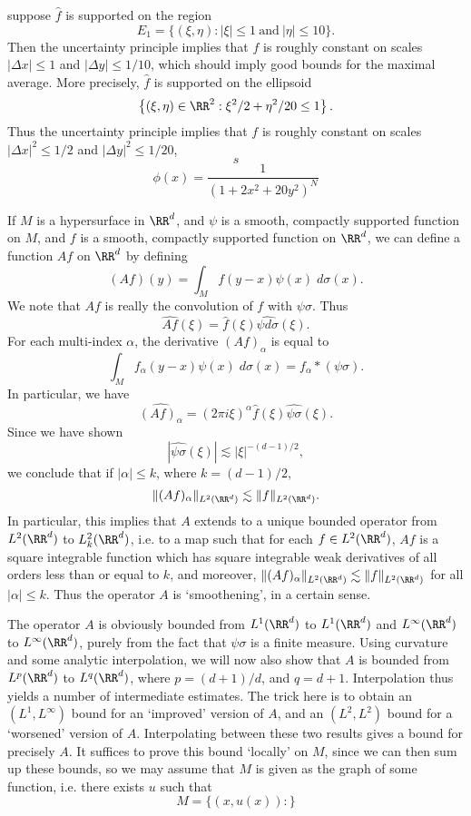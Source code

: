 suppose $\widehat{f}$ is supported on the region
%
\[ E_1 = \{ (\xi,\eta) : |\xi| \leq 1\ \text{and}\ |\eta| \leq 10 \}. \]
%
Then the uncertainty principle implies that $f$ is roughly constant on scales $|\Delta x| \leq 1$ and $|\Delta y| \leq 1/10$, which should imply good bounds for the maximal average. More precisely, $\widehat{f}$ is supported on the ellipsoid
%
\[ \left\{ (\xi,\eta) \in \RR^2 : \xi^2/2 + \eta^2/20 \leq 1 \right\}. \]
%
Thus the uncertainty principle implies that $f$ is roughly constant on scales $|\Delta x|^2 \leq 1/2$ and $|\Delta y|^2 \leq 1/20$,
%
\[ s \]
%
\[ \phi(x) = \frac{1}{( 1 + 2 x^2 + 20 y^2 )^N} \] 


\begin{example}
  If $M$ is a hypersurface in $\RR^d$, and $\psi$ is a smooth, compactly supported function on $M$, and $f$ is a smooth, compactly supported function on $\RR^d$, we can define a function $Af$ on $\RR^d$ by defining
  \[ (Af)(y) = \int_M f(y - x) \psi(x)\; d\sigma(x). \]
  We note that $Af$ is really the convolution of $f$ with $\psi \sigma$. Thus
  \[ \widehat{Af}(\xi) = \widehat{f}(\xi) \widehat{\psi d\sigma}(\xi). \]
  For each multi-index $\alpha$, the derivative $(Af)_\alpha$ is equal to
  \[ \int_M f_\alpha(y-x) \psi(x)\; d\sigma(x) = f_\alpha * (\psi \sigma). \]
  In particular, we have
  \[ \widehat{(Af)_\alpha} = (2 \pi i \xi)^\alpha \widehat{f}(\xi) \widehat{\psi \sigma}(\xi). \]
  Since we have shown
  \[ |\widehat{\psi \sigma}(\xi)| \lesssim |\xi|^{-(d-1)/2}, \]
  we conclude that if $|\alpha| \leq k$, where $k = (d-1)/2$,
  \[ \| (Af)_\alpha \|_{L^2(\RR^d)} \lesssim \| f \|_{L^2(\RR^d)}. \]
  In particular, this implies that $A$ extends to a unique bounded operator from $L^2(\RR^d)$ to $L^2_k(\RR^d)$, i.e. to a map such that for each $f \in L^2(\RR^d)$, $Af$ is a square integrable function which has square integrable weak derivatives of all orders less than or equal to $k$, and moreover, $\| (Af)_\alpha \|_{L^2(\RR^d)} \lesssim \| f \|_{L^2(\RR^d)}$ for all $|\alpha| \leq k$. Thus the operator $A$ is `smoothening', in a certain sense.

  The operator $A$ is obviously bounded from $L^1(\RR^d)$ to $L^1(\RR^d)$ and $L^\infty(\RR^d)$ to $L^\infty(\RR^d)$, purely from the fact that $\psi \sigma$ is a finite measure. Using curvature and some analytic interpolation, we will now also show that $A$ is bounded from $L^p(\RR^d)$ to $L^q(\RR^d)$, where $p = (d+1)/d$, and $q = d+1$. Interpolation thus yields a number of intermediate estimates. The trick here is to obtain an $(L^1,L^\infty)$ bound for an `improved' version of $A$, and an $(L^2,L^2)$ bound for a `worsened' version of $A$. Interpolating between these two results gives a bound for precisely $A$. It suffices to prove this bound `locally' on $M$, since we can then sum up these bounds, so we may assume that $M$ is given as the graph of some function, i.e. there exists $u$ such that
  \[ M = \{ (x,u(x)):  \} \]



\end{example}
